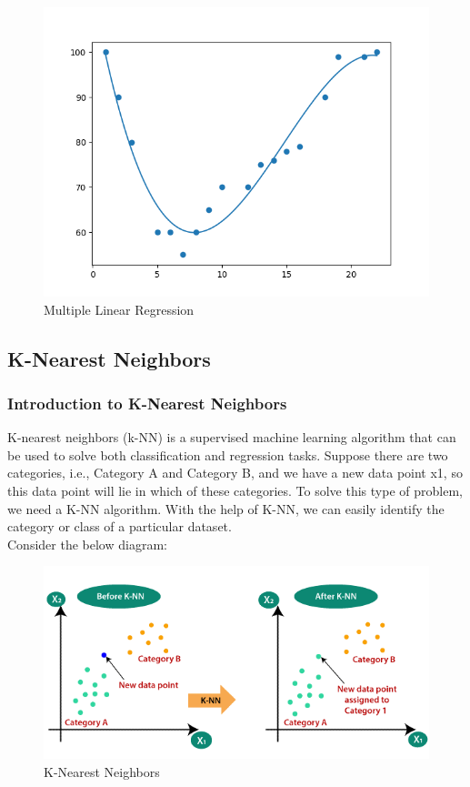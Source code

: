     \begin{figure}[H]
        \includegraphics[width=\linewidth]{images/plr.png}
        \caption{Multiple Linear Regression}
        \label{fig:plr}
    \end{figure}
    
\subsection{K-Nearest Neighbors}
\subsubsection{Introduction to K-Nearest Neighbors}
K-nearest neighbors (k-NN) is a supervised machine learning algorithm that can be used to solve both classification and regression tasks.
Suppose there are two categories, i.e., Category A and Category B, and we have a new data point x1, so this data point will lie in which of these categories. To solve this type of problem, we need a K-NN algorithm. With the help of K-NN, we can easily identify the category or class of a particular dataset. \\ Consider the below diagram:

    \begin{figure}[H]
        \includegraphics[width=\linewidth]{images/knnexp.png}
        \caption{K-Nearest Neighbors}
        \label{fig:knn}
    \end{figure}
    
